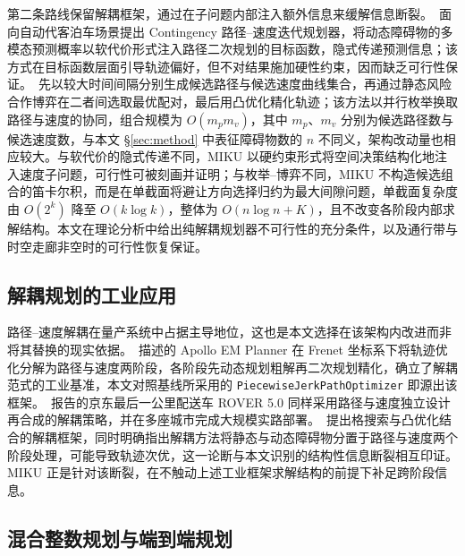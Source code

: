 \documentclass[a4paper,11pt]{ctexart}
\theoremstyle{definition}
\begin{document}
第二条路线保留解耦框架，通过在子问题内部注入额外信息来缓解信息断裂。\citet{han2026_contingency}~面向自动代客泊车场景提出 Contingency 路径--速度迭代规划器，将动态障碍物的多模态预测概率以软代价形式注入路径二次规划的目标函数，隐式传递预测信息；该方式在目标函数层面引导轨迹偏好，但不对结果施加硬性约束，因而缺乏可行性保证。\citet{zhang2023_dp_rcg}~先以较大时间间隔分别生成候选路径与候选速度曲线集合，再通过静态风险合作博弈在二者间选取最优配对，最后用凸优化精化轨迹；该方法以并行枚举换取路径与速度的协同，组合规模为 $O(m_p m_v)$，其中 $m_p$、$m_v$ 分别为候选路径数与候选速度数，与本文 §\ref{sec:method} 中表征障碍物数的 $n$ 不同义，架构改动量也相应较大。与软代价的隐式传递不同，MIKU 以硬约束形式将空间决策结构化地注入速度子问题，可行性可被刻画并证明；与枚举--博弈不同，MIKU 不构造候选组合的笛卡尔积，而是在单截面将避让方向选择归约为最大间隙问题，单截面复杂度由 $O(2^k)$ 降至 $O(k\log k)$，整体为 $O(n\log n + K)$，且不改变各阶段内部求解结构。本文在理论分析中给出纯解耦规划器不可行性的充分条件，以及通行带与时空走廊非空时的可行性恢复保证。

\subsection{解耦规划的工业应用}
\label{sec:related-industrial}

路径--速度解耦在量产系统中占据主导地位，这也是本文选择在该架构内改进而非将其替换的现实依据。\citet{fan2018baidu}~描述的 Apollo EM Planner 在 Frenet 坐标系下将轨迹优化分解为路径与速度两阶段，各阶段先动态规划粗解再二次规划精化，确立了解耦范式的工业基准，本文对照基线所采用的 \texttt{PiecewiseJerkPathOptimizer} 即源出该框架。\citet{wang2022_jfr}~报告的京东最后一公里配送车 ROVER 5.0 同样采用路径与速度独立设计再合成的解耦策略，并在多座城市完成大规模实路部署。\citet{meng2019_access}~提出格搜索与凸优化结合的解耦框架，同时明确指出解耦方法将静态与动态障碍物分置于路径与速度两个阶段处理，可能导致轨迹次优，这一论断与本文识别的结构性信息断裂相互印证。MIKU 正是针对该断裂，在不触动上述工业框架求解结构的前提下补足跨阶段信息。

\subsection{混合整数规划与端到端规划}
\label{sec:related-supplement}
\end{document}
